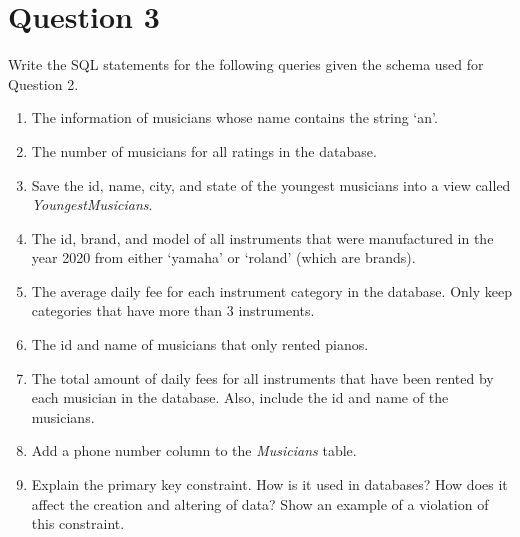 \documentclass[letterpaper, 11pt]{article}
\begin{document}
\section*{Question 3}

Write the SQL statements for the following queries given the schema used for Question 2.

\begin{enumerate}[label={\alph*}.,leftmargin=*]
    \item The information of musicians whose name contains the string `an'.
    \item The number of musicians for all ratings in the database.
    \item Save the id, name, city, and state of the youngest musicians into a view called \textit{YoungestMusicians}.
    \item The id, brand, and model of all instruments that were manufactured in the year 2020 from either `yamaha' or `roland' (which are brands).
    \item The average daily fee for each instrument category in the database. Only keep categories that have more than 3 instruments.
    \item The id and name of musicians that only rented pianos.
    \item The total amount of daily fees for all instruments that have been rented by each musician in the database. Also, include the id and name of the musicians.
    \item Add a phone number column to the \textit{Musicians} table.
    \item Explain the primary key constraint. How is it used in databases? How does it affect the creation and altering of data? Show an example of a violation of this constraint.
\end{enumerate}
\end{document}
